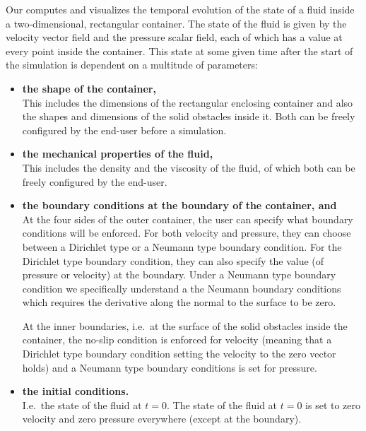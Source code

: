 \documentclass[11pt,a4paper,twoside,openright]{report}
\begin{document}
Our \software{} computes and visualizes the temporal evolution of the state of a fluid inside a two-dimensional, rectangular container. The state of the fluid is given by the velocity vector field and the pressure scalar field, each of which has a value at every point inside the container. This state at some given time after the start of the simulation is dependent on a multitude of parameters:
\begin{itemize}
	\item \textbf{the shape of the container,}\\
		This includes the dimensions of the rectangular enclosing container and also the shapes and dimensions of the solid obstacles inside it. Both can be freely configured by the end-user before a simulation.
	\item \textbf{the mechanical properties of the fluid,}\\
		This includes the density and the viscosity of the fluid, of which both can be freely configured by the end-user.
	\item \textbf{the boundary conditions at the boundary of the container, and}\\
		At the four sides of the outer container, the user can specify what boundary conditions will be enforced. For both velocity and pressure, they can choose between a Dirichlet type or a Neumann type boundary condition. For the Dirichlet type boundary condition, they can also specify the value (of pressure or velocity) at the boundary. Under a Neumann type boundary condition we specifically understand a the Neumann boundary conditions which requires the derivative along the normal to the surface to be zero.
		\vxlisp

		At the inner boundaries, i.e.\ at the surface of the solid obstacles inside the container, the no-slip condition is enforced for velocity (meaning that a Dirichlet type boundary condition setting the velocity to the zero vector holds) and a Neumann type boundary conditions is set for pressure.
	\item \textbf{the initial conditions.}\\
		I.e.\ the state of the fluid at $t=0$. The state of the fluid at $t=0$ is set to zero velocity and zero pressure everywhere (except at the boundary).
\end{itemize}
\end{document}
